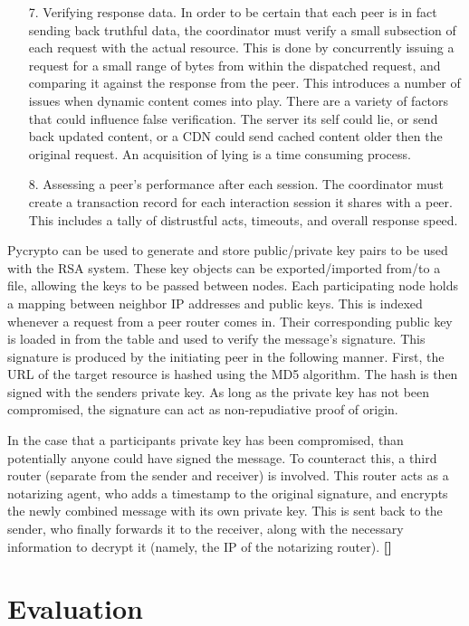 \documentclass[12pt]{article}
\newcommand{\lcite}[1]
{{\bfseries\color{orange}[#1]}}
\begin{document}
\begin{itemize}
				\item[7.] Verifying response data. In order to be certain that each peer is in fact sending back truthful data, the coordinator must verify a small subsection of each request with the actual resource. This is done by concurrently issuing a request for a small range of bytes from within the dispatched request, and comparing it against the response from the peer. This introduces a number of issues when dynamic content comes into play. There are a variety of factors that could influence false verification. The server its self could lie, or send back updated content, or a CDN could send cached content older then the original request. An acquisition of lying is a time consuming process.
				\item[8.] Assessing a peer's performance after each session. The coordinator must create a transaction record for each interaction session it shares with a peer. This includes a tally of distrustful acts, timeouts, and overall response speed.
			\end{itemize}

			Pycrypto can be used to generate and store public/private key pairs to be used with the RSA system. These key objects can be exported/imported from/to a file, allowing the keys to be passed between nodes. Each participating node holds a mapping between neighbor IP addresses and public keys. This is indexed whenever a request from a peer router comes in. Their corresponding public key is loaded in from the table and used to verify the message's signature. This signature is produced by the initiating peer in the following manner. First, the URL of the target resource is hashed using the MD5 algorithm. The hash is then signed with the senders private key. As long as the private key has not been compromised, the signature can act as non-repudiative proof of origin.

			In the case that a participants private key has been compromised, than potentially anyone could have signed the message. To counteract this, a third router (separate from the sender and receiver) is involved. This router acts as a notarizing agent, who adds a timestamp to the original signature, and encrypts the newly combined message with its own private key. This is sent back to the sender, who finally forwards it to the receiver, along with the necessary information to decrypt it (namely, the IP of the notarizing router). \lcite{}




\newpage
\section{Evaluation}
	
\end{document}
